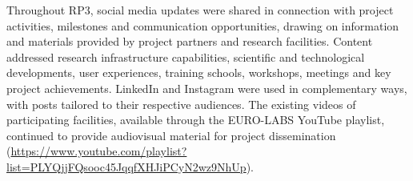 Throughout RP3, social media updates were shared in connection with project activities, milestones and communication opportunities, drawing on information and materials provided by project partners and research facilities. Content addressed research infrastructure capabilities, scientific and technological developments, user experiences, training schools, workshops, meetings and key project achievements. LinkedIn and Instagram were used in complementary ways, with posts tailored to their respective audiences. The existing videos of participating facilities, available through the EURO-LABS YouTube playlist, continued to provide audiovisual material for project dissemination (\url{https://www.youtube.com/playlist?list=PLYQjjFQsooc45JqqfXHJiPCyN2wz9NhUp}). 




